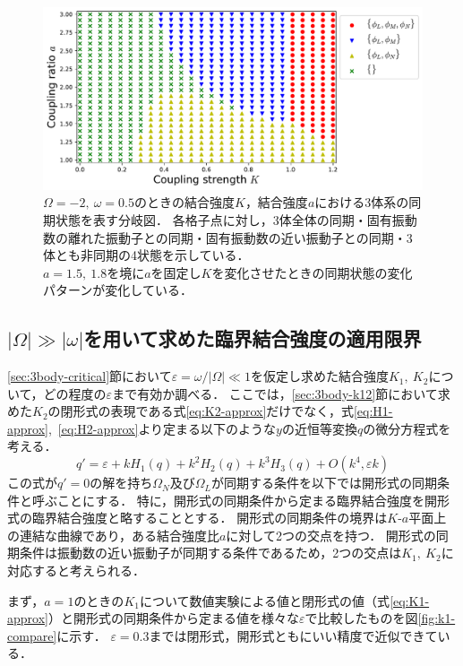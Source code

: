 \documentclass[../main]{subfiles}
\begin{document}
\begin{figure}[tbp]
\centering
\includegraphics[width=135mm]{./images/three-body-phase-boundary.pdf}
\centering
\caption{$\Omega=-2,\ \omega=0.5$のときの結合強度$K$，結合強度$a$における3体系の同期状態を表す分岐図．
各格子点に対し，3体全体の同期・固有振動数の離れた振動子との同期・固有振動数の近い振動子との同期・3体とも非同期の4状態を示している．\\
$a=1.5,\ 1.8$を境に$a$を固定し$K$を変化させたときの同期状態の変化パターンが変化している．}
\label{fig:3body-phase-boundary}
\end{figure}

\subsection{$|\Omega|\gg|\omega|$を用いて求めた臨界結合強度の適用限界}
\ref{sec:3body-critical}節において$\varepsilon=\omega/|\Omega|\ll 1$を仮定し求めた結合強度$K_1,\ K_2$について，どの程度の$\varepsilon$まで有効か調べる．
ここでは，\ref{sec:3body-k12}節において求めた$K_2$の閉形式の表現である式\eqref{eq:K2-approx}だけでなく，式\eqref{eq:H1-approx},\ \eqref{eq:H2-approx}より定まる以下のような$y$の近恒等変換$q$の微分方程式を考える．
\begin{equation}
    \label{eq:k1k2-open}
    q'=\varepsilon+kH_1(q)+k^2H_2(q)+k^3H_3(q)+O(k^4,\varepsilon k)
\end{equation}
この式が$q'=0$の解を持ち$\Omega_N$及び$\Omega_L$が同期する条件を以下では開形式の同期条件と呼ぶことにする．
特に，開形式の同期条件から定まる臨界結合強度を開形式の臨界結合強度と略することとする．
開形式の同期条件の境界は$K$-$a$平面上の連結な曲線であり，ある結合強度比$a$に対して2つの交点を持つ．
開形式の同期条件は振動数の近い振動子が同期する条件であるため，2つの交点は$K_1,\ K_2$に対応すると考えられる．

まず，$a=1$のときの$K_1$について数値実験による値と閉形式の値（式\eqref{eq:K1-approx}）と開形式の同期条件から定まる値を様々な$\varepsilon$で比較したものを図\ref{fig:k1-compare}に示す．
$\varepsilon=0.3$までは閉形式，開形式ともにいい精度で近似できている．
\end{document}
